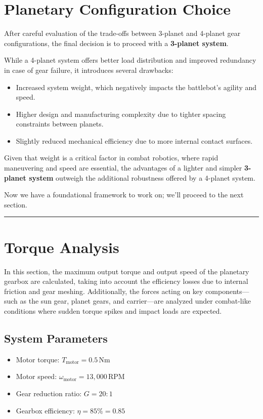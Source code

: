 \documentclass[a4paper,12pt]{article}
\begin{document}
\section*{Planetary Configuration Choice}

After careful evaluation of the trade-offs between 3-planet and 4-planet gear configurations, the final decision is to proceed with a \textbf{3-planet system}. 

While a 4-planet system offers better load distribution and improved redundancy in case of gear failure, it introduces several drawbacks:
\begin{itemize}
    \item Increased system weight, which negatively impacts the battlebot’s agility and speed.
    \item Higher design and manufacturing complexity due to tighter spacing constraints between planets.
    \item Slightly reduced mechanical efficiency due to more internal contact surfaces.
\end{itemize}

Given that weight is a critical factor in combat robotics, where rapid maneuvering and speed are essential, the advantages of a lighter and simpler \textbf{3-planet system} outweigh the additional robustness offered by a 4-planet system.

Now we have a foundational framework to work on; we'll proceed to the next section.

\vspace{1em}
\noindent\rule{\linewidth}{0.6pt}
\vspace{1em}

\section{Torque Analysis} \label{sec:torque}

In this section, the maximum output torque and output speed of the planetary gearbox are calculated, taking into account the efficiency losses due to internal friction and gear meshing. Additionally, the forces acting on key components—such as the sun gear, planet gears, and carrier—are analyzed under combat-like conditions where sudden torque spikes and impact loads are expected.

\subsection*{System Parameters}
\begin{itemize}
    \item Motor torque: \( T_{\text{motor}} = 0.5 \, \text{Nm} \)
    \item Motor speed: \( \omega_{\text{motor}} = 13{,}000 \, \text{RPM} \)
    \item Gear reduction ratio: \( G = 20:1 \)
    \item Gearbox efficiency: \( \eta = 85\% = 0.85 \)
\end{itemize}
\end{document}
